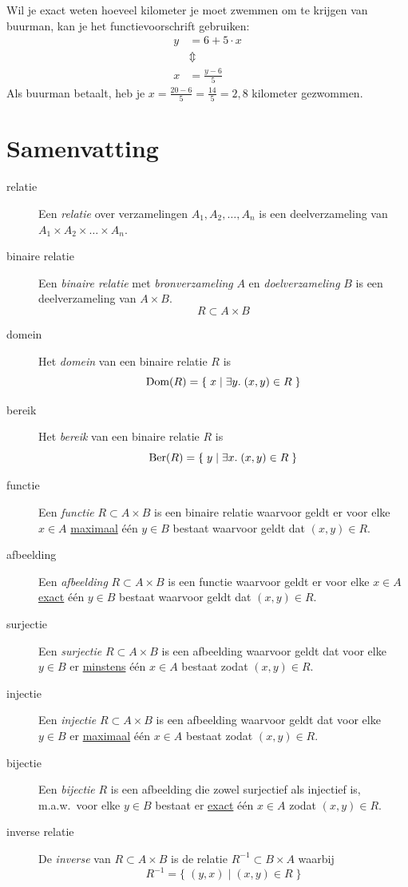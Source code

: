 Wil je exact weten hoeveel kilometer je moet zwemmen om  te krijgen van buurman, kan je het functievoorschrift gebruiken:
\[
\begin{split}
y&=6+5\cdot x\\
& \Updownarrow\\
x&=\frac{y-6}{5}
\end{split}
\]
Als buurman  betaalt, heb je $x=\frac{20-6}{5}=\frac{14}{5}=2,8$ kilometer gezwommen.

\section{Samenvatting}
\begin{description}
  \item[relatie] Een \emph{relatie} over verzamelingen $A_1, A_2, \dots, A_n$ is een deelverzameling van $A_1 \times A_2 \times \dots \times A_n$.
  \item[binaire relatie] Een \emph{binaire relatie} met \emph{bronverzameling} $A$ en \emph{doelverzameling} $B$ is een deelverzameling van $A \times B$.
    \[ R \subset A \times B \]
  \item[domein] Het \emph{domein} van een binaire relatie $R$ is
    \[ \text{Dom}(R) = \{ \; x \;|\; \exists y. \; (x, y) \in R \; \} \]
  \item[bereik] Het \emph{bereik} van een binaire relatie $R$ is
    \[ \text{Ber}(R) = \{ \; y \;|\; \exists x. \; (x, y) \in R \; \} \]
  \item[functie] Een \emph{functie} $R \subset A \times B$ is een binaire relatie waarvoor geldt er voor elke $x \in A$ \underline{maximaal} \'e\'en $y \in B$ bestaat waarvoor geldt dat $(x,y) \in R$.
  \item[afbeelding] Een \emph{afbeelding} $R \subset A \times B$ is een functie waarvoor geldt er voor elke $x \in A$ \underline{exact} \'e\'en $y \in B$ bestaat waarvoor geldt dat $(x, y) \in R$.
  \item[surjectie] Een \emph{surjectie} $R \subset A \times B$ is een afbeelding waarvoor geldt dat voor elke $y \in B$ er \underline{minstens} \'e\'en $x \in A$ bestaat zodat $(x, y) \in R$.
  \item[injectie] Een \emph{injectie} $R \subset A \times B$ is een afbeelding waarvoor geldt dat voor elke $y \in B$ er \underline{maximaal} \'e\'en $x \in A$ bestaat zodat $(x, y) \in R$.
  \item[bijectie] Een \emph{bijectie} $R$ is een afbeelding die zowel surjectief als injectief is, m.a.w.\ voor elke $y \in B$ bestaat er \underline{exact} \'e\'en $x \in A$ zodat $(x, y) \in R$.
  \item[inverse relatie] De \emph{inverse} van $R \subset A \times B$ is de relatie $R^{-1} \subset B \times A$ waarbij
    \[ R^{-1} = \{ \; (y, x) \;|\; (x, y) \in R \; \} \]
\end{description}



